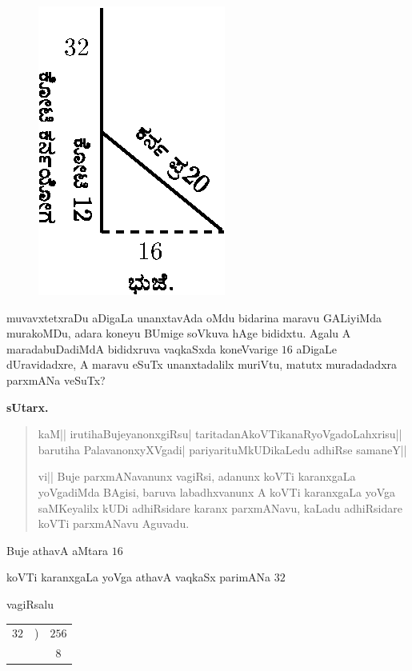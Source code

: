 \begin{figure}[H]
\centering
\includegraphics{figure/fig25.eps}
\end{figure}

muvavxtetxraDu aDigaLa unanxtavAda oMdu bidarina maravu GALiyiMda
murakoMDu, adara koneyu BUmige soVkuva hAge bididxtu. Agalu A
maradabuDadiMdA bididxruva vaqkaSxda koneVvarige $16$ aDigaLe
dUravidadxre, A maravu eSuTx unanxtadalilx muriVtu, matutx
muradadadxra parxmANa veSuTx?

\medskip
\begin{center}
{\large\bf sUtarx.}
\end{center}

\begin{verse}
kaM|| irutihaBujeyanonxgiRsu| taritadanAkoVTikanaRyoVgadoLahxrisu||
barutiha PalavanonxyXVgadi| pariyarituMkUDikaLedu adhiRse samaneY||

vi|| Buje parxmANavanunx vagiRsi, adanunx koVTi karanxgaLa yoVgadiMda
BAgisi, baruva labadhxvanunx A koVTi karanxgaLa yoVga saMKeyalilx kUDi
adhiRsidare karanx parxmANavu, kaLadu adhiRsidare koVTi parxmANavu
Aguvadu. 
\end{verse}

Buje athavA aMtara $16$

koVTi karanxgaLa yoVga athavA vaqkaSx parimANa $32$

vagiRsalu

\medskip

\begin{tabular}{r@{}c@{}c}
$32$ & ) & $256$\\
\cline{3-3}
 & & $8$
\end{tabular}

